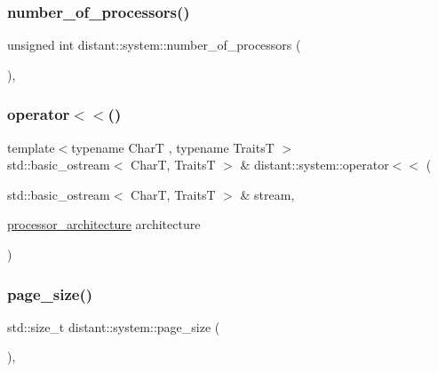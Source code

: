 \subsubsection{\texorpdfstring{number\+\_\+of\+\_\+processors()}{number\_of\_processors()}}
{\footnotesize\ttfamily unsigned int distant\+::system\+::number\+\_\+of\+\_\+processors (\begin{DoxyParamCaption}{ }\end{DoxyParamCaption})\hspace{0.3cm}{\ttfamily [inline]}, {\ttfamily [noexcept]}}

\mbox{\label{namespacedistant_1_1system_acbe303e89557abad01810a9e4bf99584}} 
\subsubsection{\texorpdfstring{operator$<$$<$()}{operator<<()}}
{\footnotesize\ttfamily template$<$typename CharT , typename TraitsT $>$ \\
std\+::basic\+\_\+ostream$<$ CharT, TraitsT $>$ \& distant\+::system\+::operator$<$$<$ (\begin{DoxyParamCaption}\item[{std\+::basic\+\_\+ostream$<$ CharT, TraitsT $>$ \&}]{stream,  }\item[{\mbox{\hyperlink{namespacedistant_1_1system_aabfc7b1c055c49cfbb199db3374aaddd}{processor\+\_\+architecture}}}]{architecture }\end{DoxyParamCaption})}

\mbox{\label{namespacedistant_1_1system_a7669b2fad6cd394972ab6d4fe1b16648}} 
\subsubsection{\texorpdfstring{page\+\_\+size()}{page\_size()}}
{\footnotesize\ttfamily std\+::size\+\_\+t distant\+::system\+::page\+\_\+size (\begin{DoxyParamCaption}{ }\end{DoxyParamCaption})\hspace{0.3cm}{\ttfamily [inline]}, {\ttfamily [noexcept]}}

